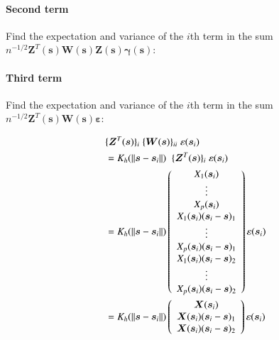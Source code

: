 \documentclass[authoryear, review, 11pt]{elsarticle}
\begin{document}
        \paragraph{Second term}
        Find the expectation and variance of the $i$th term in the sum $n^{-1/2} \bm{Z}^T(\bm{s}) \bm{W}(\bm{s}) \bm{Z}(\bm{s}) \bm{\gamma}(\bm{s})$:

        \paragraph{Third term}
        Find the expectation and variance of the $i$th term in the sum $n^{-1/2} \bm{Z}^T(\bm{s}) \bm{W}(\bm{s}) \bm{\varepsilon}$:

        \begin{align}\label{eq:epsilon-term}
            \; &\{ \bm{Z}^T(\bm{s}) \}_i \; \{ \bm{W}(\bm{s}) \}_{ii} \; \varepsilon(\bm{s}_i) \notag \\
            &= K_h(\| \bm{s} - \bm{s}_i \|) \; \; \{ \bm{Z}^T(\bm{s}) \}_i \; \varepsilon(\bm{s}_i) \notag \\
            &= K_h(\| \bm{s} - \bm{s}_i \|) \left( \begin{array}{c} X_1(\bm{s}_i) \\ \vdots \\ X_p(\bm{s}_i) \\ X_1(\bm{s}_i) (\bm{s}_i - \bm{s})_1 \\ \vdots \\ X_p(\bm{s}_i) (\bm{s}_i - \bm{s})_1 \\ X_1(\bm{s}_i) (\bm{s}_i - \bm{s})_2 \\ \vdots \\X_p(\bm{s}_i) (\bm{s}_i - \bm{s})_2 \end{array} \right) \varepsilon(\bm{s}_i) \notag \\
            &= K_h(\| \bm{s} - \bm{s}_i \|) \left( \begin{array}{c} \bm{X}(\bm{s}_i) \\ \bm{X}(\bm{s}_i) (\bm{s}_i - \bm{s})_1 \\ \bm{X}(\bm{s}_i) (\bm{s}_i - \bm{s})_2 \end{array} \right) \varepsilon(\bm{s}_i)
        \end{align}
\end{document}
